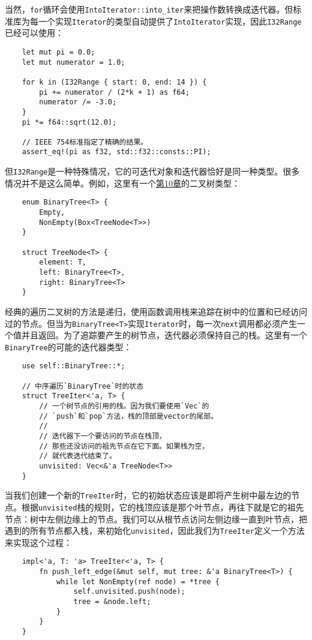 当然，\texttt{for}循环会使用\texttt{IntoIterator::into\_iter}来把操作数转换成迭代器。但标准库为每一个实现\texttt{Iterator}的类型自动提供了\texttt{IntoIterator}实现，因此\texttt{I32Range}已经可以使用：
\begin{verbatim}
    let mut pi = 0.0;
    let mut numerator = 1.0;

    for k in (I32Range { start: 0, end: 14 }) {
        pi += numerator / (2*k + 1) as f64;
        numerator /= -3.0;
    }
    pi *= f64::sqrt(12.0);

    // IEEE 754标准指定了精确的结果。
    assert_eq!(pi as f32, std::f32::consts::PI);
\end{verbatim}

但\texttt{I32Range}是一种特殊情况，它的可迭代对象和迭代器恰好是同一种类型。很多情况并不是这么简单。例如，这里有一个\hyperref[ch10]{第10章}的二叉树类型：
\begin{verbatim}
    enum BinaryTree<T> {
        Empty,
        NonEmpty(Box<TreeNode<T>>)
    }

    struct TreeNode<T> {
        element: T,
        left: BinaryTree<T>,
        right: BinaryTree<T>
    }
\end{verbatim}

经典的遍历二叉树的方法是递归，使用函数调用栈来追踪在树中的位置和已经访问过的节点。但当为\texttt{BinaryTree<T>}实现\texttt{Iterator}时，每一次\texttt{next}调用都必须产生一个值并且返回。为了追踪要产生的树节点，迭代器必须保持自己的栈。这里有一个\texttt{BinaryTree}的可能的迭代器类型：
\begin{verbatim}
    use self::BinaryTree::*;

    // 中序遍历`BinaryTree`时的状态
    struct TreeIter<'a, T> {
        // 一个树节点的引用的栈。因为我们要使用`Vec`的
        // `push`和`pop`方法，栈的顶部是vector的尾部。
        //
        // 迭代器下一个要访问的节点在栈顶，
        // 那些还没访问的祖先节点在它下面。如果栈为空，
        // 就代表迭代结束了。
        unvisited: Vec<&'a TreeNode<T>>
    }
\end{verbatim}

当我们创建一个新的\texttt{TreeIter}时，它的初始状态应该是即将产生树中最左边的节点。根据\texttt{unvisited}栈的规则，它的栈顶应该是那个叶节点，再往下就是它的祖先节点：树中左侧边缘上的节点。我们可以从根节点访问左侧边缘一直到叶节点，把遇到的所有节点都入栈，来初始化\texttt{unvisited}，因此我们为\texttt{TreeIter}定义一个方法来实现这个过程：
\begin{verbatim}
    impl<'a, T: 'a> TreeIter<'a, T> {
        fn push_left_edge(&mut self, mut tree: &'a BinaryTree<T>) {
            while let NonEmpty(ref node) = *tree {
                self.unvisited.push(node);
                tree = &node.left;
            }
        }
    }
\end{verbatim}

